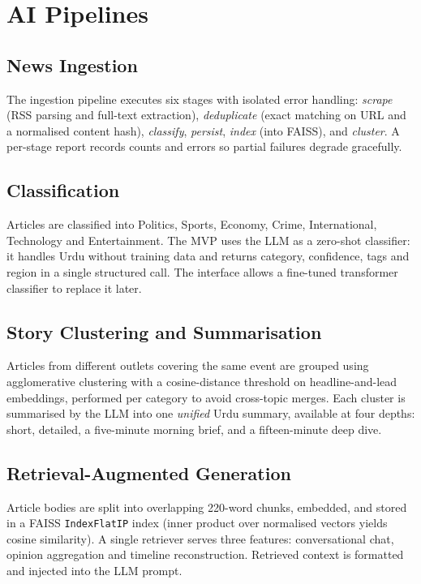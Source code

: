 \documentclass[11pt,a4paper]{article}
\begin{document}
\section{AI Pipelines}

\subsection{News Ingestion}
The ingestion pipeline executes six stages with isolated error handling:
\emph{scrape} (RSS parsing and full-text extraction), \emph{deduplicate}
(exact matching on URL and a normalised content hash), \emph{classify},
\emph{persist}, \emph{index} (into FAISS), and \emph{cluster}. A per-stage
report records counts and errors so partial failures degrade gracefully.

\subsection{Classification}
Articles are classified into Politics, Sports, Economy, Crime, International,
Technology and Entertainment. The MVP uses the LLM as a zero-shot classifier:
it handles Urdu without training data and returns category, confidence, tags
and region in a single structured call. The interface allows a fine-tuned
transformer classifier to replace it later.

\subsection{Story Clustering and Summarisation}
Articles from different outlets covering the same event are grouped using
agglomerative clustering with a cosine-distance threshold on headline-and-lead
embeddings, performed per category to avoid cross-topic merges. Each cluster is
summarised by the LLM into one \emph{unified} Urdu summary, available at four
depths: short, detailed, a five-minute morning brief, and a fifteen-minute deep
dive.

\subsection{Retrieval-Augmented Generation}
Article bodies are split into overlapping 220-word chunks, embedded, and stored
in a FAISS \texttt{IndexFlatIP} index (inner product over normalised vectors
yields cosine similarity). A single retriever serves three features:
conversational chat, opinion aggregation and timeline reconstruction. Retrieved
context is formatted and injected into the LLM prompt.
\end{document}
